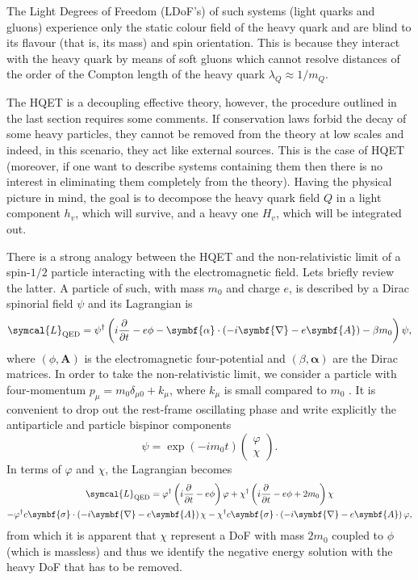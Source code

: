 The Light Degrees of Freedom (LDoF's) of such systems (light quarks and gluons) experience only the static colour field of the heavy quark and are blind to its flavour (that is, its mass) and spin orientation. This is because they interact with the heavy quark by means of soft gluons which cannot resolve distances of the order of the Compton length of the heavy quark $\lambda_Q \approx 1/m_Q$.

The HQET is a decoupling effective theory, however, the procedure outlined in the last section requires some comments. If conservation laws forbid the decay of some heavy particles, they cannot be removed from the theory at low scales and indeed, in this scenario, they act like external sources. This is the case of HQET (moreover, if one want to describe systems containing them then there is no interest in eliminating them completely from the theory). Having the physical picture in mind, the goal is to decompose the heavy quark field $Q$ in a light component $h_v$, which will survive, and a heavy one $H_v$, which will be integrated out. 

There is a strong analogy between the HQET and the non-relativistic limit of a spin-$1/2$ particle interacting with the electromagnetic field. Lets briefly review the latter. A particle of such, with mass $m_0$ and charge $e$, is described by a Dirac spinorial field $\psi$ and its Lagrangian is
\begin{equation}
  \symcal{L}_\text{QED} = \psi^\dagger \left( i \frac{\partial}{\partial t} - e \phi - \symbf{\alpha} \cdot \left(-i \symbf{\nabla} - e \symbf{A} \right) - \beta m_0 \right) \psi ,
\end{equation}
where $(\phi, \symbf{A})$ is the electromagnetic four-potential and $(\beta, \symbf{\alpha})$ are the Dirac matrices. In order to take the non-relativistic limit, we consider a particle with four-momentum $p_\mu = m_0 \delta_{\mu 0} + k_\mu$, where $k_\mu$ is small compared to $m_0$ . It is convenient to drop out the rest-frame oscillating phase and write explicitly the antiparticle and particle bispinor components
\begin{equation}
  \psi = \exp \left( - i m_0 t \right) \begin{pmatrix} \varphi \\ \chi \end{pmatrix} .
  \label{eq:nrqed_decomposition}
\end{equation}
In terms of $\varphi$ and $\chi$, the Lagrangian becomes
\begin{multline}
  \symcal{L}_\text{QED} = \varphi^\dagger \left(i \frac{\partial}{\partial t} - e \phi \right) \varphi + \chi^\dagger \left(i \frac{\partial}{\partial t} - e \phi + 2 m_0 \right) \chi \\ - \varphi^\dagger c \symbf{\sigma} \cdot \left(-i \symbf{\nabla} - e \symbf{A} \right) \chi - \chi^\dagger c \symbf{\sigma} \cdot \left(- i \symbf{\nabla} - e \symbf{A} \right) \varphi ,
\end{multline}
from which it is apparent that $\chi$ represent a DoF with mass $2 m_0$ coupled to $\phi$ (which is massless) and thus we identify the negative energy solution with the heavy DoF that has to be removed.

